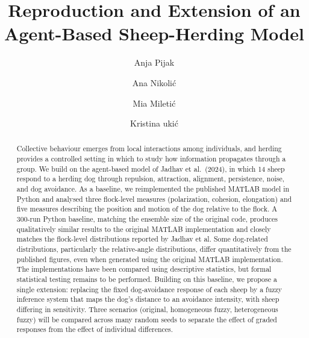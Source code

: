 \documentclass[9pt,twoside]{pnas-new}
\begin{document}
\title{Reproduction and Extension of an Agent-Based Sheep-Herding Model}

\author[a]{Anja Pijak}
\author[a]{Ana Nikolić}
\author[a]{Mia Miletić}
\author[a]{Kristina \DJ uki\'c}






\begin{abstract}
Collective behaviour emerges from local interactions among individuals, and herding provides a controlled setting in which to study how information propagates through a group. We build on the agent-based model of Jadhav et al.\ (2024), in which 14 sheep respond to a herding dog through repulsion, attraction, alignment, persistence, noise, and dog avoidance. As a baseline, we reimplemented the published MATLAB model in Python and analysed three flock-level measures (polarization, cohesion, elongation) and five measures describing the position and motion of the dog relative to the flock. A 300-run Python baseline, matching the ensemble size of the original code, produces qualitatively similar results to the original MATLAB implementation and closely matches the flock-level distributions reported by Jadhav et al. Some dog-related distributions, particularly the relative-angle distributions, differ quantitatively from the published figures, even when generated using the original MATLAB implementation. The implementations have been compared using descriptive statistics, but formal statistical testing remains to be performed. Building on this baseline, we propose a single extension: replacing the fixed dog-avoidance response of each sheep by a fuzzy inference system that maps the dog's distance to an avoidance intensity, with sheep differing in sensitivity. Three scenarios (original, homogeneous fuzzy, heterogeneous fuzzy) will be compared across many random seeds to separate the effect of graded responses from the effect of individual differences.
\end{abstract}
\end{document}
